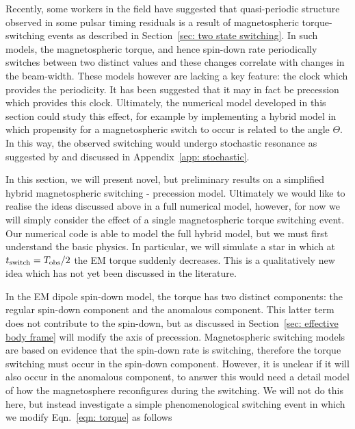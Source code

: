 \documentclass[../full_thesis/full_thesis.tex]{subfiles}
\begin{document}
Recently, some workers in the field \citep{Lyne2010, Perera2015} have suggested
that quasi-periodic structure observed in some pulsar timing residuals is a
result of magnetospheric torque-switching events as described in
Section~\ref{sec: two state switching}. In such models, the magnetospheric
torque, and hence spin-down rate periodically switches between two distinct
values and these changes correlate with changes in the beam-width.  These
models however are lacking a key feature: the clock which provides the
periodicity. It has been suggested \citep{Jones2012} that it may in fact be
precession which provides this clock. Ultimately, the numerical model developed
in this section could study this effect, for example by implementing a hybrid
model in which propensity for a magnetospheric switch to occur is related to
the angle $\Theta$. In this way, the observed switching would undergo
stochastic resonance as suggested by \citet{Cordes2013} and discussed in
Appendix~\ref{app: stochastic}.

In this section, we will present novel, but preliminary results on a simplified
hybrid magnetospheric switching - precession model. Ultimately we would like to
realise the ideas discussed above in a full numerical model, however, for now
we will simply consider the effect of a single magnetospheric torque switching
event. Our numerical code is able to model the full hybrid model, but we must
first understand the basic physics. In particular, we will simulate a star in
which at $t_{\mathrm{switch}} = T_{\textrm{obs}}/2$ the EM torque suddenly decreases. This is
a qualitatively new idea which has not yet been discussed in the literature.

In the EM dipole spin-down model, the torque has two distinct components: the
regular spin-down component and the anomalous component. This latter term does
not contribute to the spin-down, but as discussed in Section~\ref{sec:
effective body frame} will modify the axis of precession. Magnetospheric
switching models are based on evidence that the spin-down rate is switching,
therefore the torque switching must occur in the spin-down component. However,
it is unclear if it will also occur in the anomalous component, to answer this
would need a detail model of how the magnetosphere reconfigures during the
switching. We will not do this here, but instead investigate a simple
phenomenological switching event in which we modify Eqn.~\eqref{eqn: torque} as
follows

\newcommand{\Ss}{S_{\mathrm{S}}}
\newcommand{\Sa}{S_{\mathrm{A}}}
\end{document}
